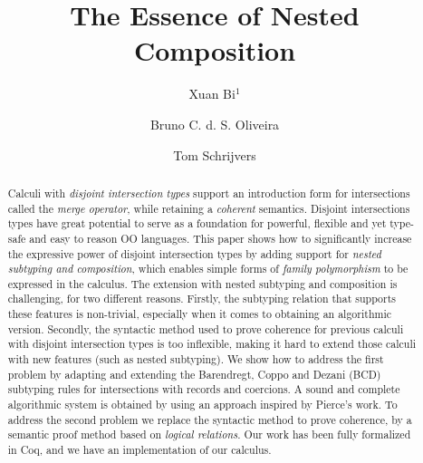 \documentclass[a4paper,UKenglish]{lipics-v2018}
\title{The Essence of Nested Composition}
\author{Xuan Bi$^1$}{The University of Hong Kong, Hong Kong, China}{xbi@cs.hku.hk}{}{}%
\author{Bruno C. d. S. Oliveira}{The University of Hong Kong, Hong Kong, China}{bruno@cs.hku.hk}{}{Funded by Hong Kong Research Grant Council projects number 17210617 and 17258816}
\author{Tom Schrijvers}{KU Leuven, Belgium}{tom.schrijvers@cs.kuleuven.be}{}{Funded by The Research Foundation - Flanders}
\begin{document}
\maketitle

\begin{abstract}
Calculi with \emph{disjoint intersection types} support an introduction form
for intersections called the
\emph{merge operator}, while retaining a \emph{coherent} semantics.
Disjoint intersections types have great potential to
serve as a foundation for powerful, flexible and yet type-safe and
easy to reason OO languages. This paper shows how to significantly
increase the expressive power of disjoint intersection types by
adding support for \emph{nested subtyping and composition}, which
enables simple forms of \emph{family polymorphism} to be expressed in the calculus.
The extension with nested subtyping and
composition is challenging, for two different reasons. Firstly, the
subtyping relation that supports these features is non-trivial,
especially when it comes to obtaining an algorithmic version. Secondly,
the syntactic method used to prove coherence for previous calculi with disjoint
intersection types is too inflexible, making it hard to
extend those calculi with new features (such as nested subtyping).
We show how to address the first problem by adapting and extending
 the Barendregt, Coppo and Dezani (BCD) subtyping rules for intersections
with records and coercions. A sound and complete algorithmic
system is obtained by using an approach inspired by Pierce's
work. To address the second
problem we replace the syntactic method to prove coherence,
by a semantic proof method based on \emph{logical relations}.
Our work has been fully formalized in Coq, and we have an implementation
of our calculus.
\end{abstract}







% 









\newpage
\appendix

\end{document}
